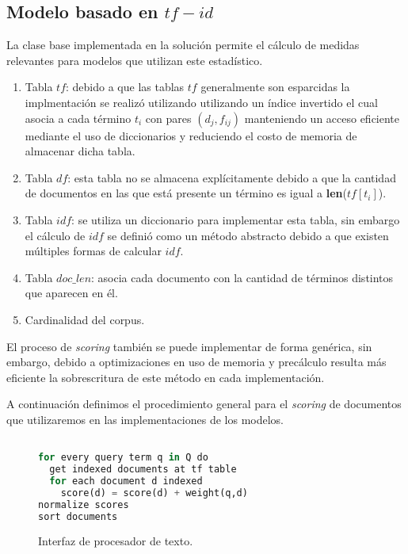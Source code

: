 \documentclass[a4paper,10pt,twocolumn]{article}
\begin{document}
	\subsection{Modelo basado en $tf-id$}\label{sub:lists}
	La clase base implementada en la soluci\'on permite el c\'alculo de medidas relevantes
	para modelos que utilizan este estad\'istico.

	\begin{enumerate}
		\item Tabla $tf$: debido a que las tablas $tf$ generalmente son esparcidas la implmentaci\'on se 
		realiz\'o utilizando utilizando un \'indice invertido el cual asocia a cada t\'ermino $t_i$ con 
		pares $(d_j, f_{ij})$ manteniendo un acceso eficiente mediante el uso de diccionarios y reduciendo el costo
		de memoria de almacenar dicha tabla.
		\item Tabla $df$: esta tabla no se almacena expl\'icitamente debido a que la cantidad de documentos en las que est\'a presente
		un t\'ermino es igual a \textbf{len}($tf[t_i]$).
		\item Tabla $idf$: se utiliza un diccionario para implementar esta tabla, sin embargo el c\'alculo de $idf$ se defini\'o como un
		m\'etodo abstracto debido a que existen m\'ultiples formas de calcular $idf$.
		\item Tabla $doc\_len$: asocia cada documento con la cantidad de t\'erminos distintos que aparecen en \'el.
		\item Cardinalidad del corpus.
	\end{enumerate}

	El proceso de \textit{scoring} tambi\'en se puede implementar de forma gen\'erica, sin embargo, debido a optimizaciones 
	en uso de memoria y prec\'alculo resulta m\'as eficiente la sobrescritura de este m\'etodo en cada implementaci\'on. 

	A continuaci\'on definimos el procedimiento general para el \textit{scoring} de documentos que utilizaremos en las 
	implementaciones de los modelos.


	\begin{figure}[htb]%
		\begin{lstlisting}[language=python]%

for every query term q in Q do
  get indexed documents at tf table
  for each document d indexed
    score(d) = score(d) + weight(q,d)
normalize scores
sort documents

		\end{lstlisting}
	\caption{Interfaz de procesador de texto.\label{fig:code}}
	\end{figure}
\end{document}
